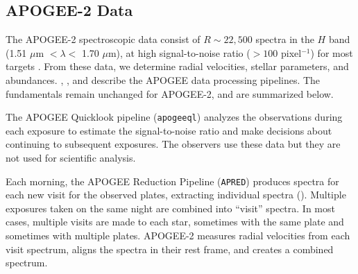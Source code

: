 \subsection{APOGEE-2 Data}

The APOGEE-2 spectroscopic data consist of $R\sim 22,500$ spectra in
the $H$ band (1.51 $\mu$m $< \lambda < $ 1.70 $\mu$m), at high
signal-to-noise ratio ($> 100 $ pixel$^{-1}$) for most targets
\citep{majewski15a}. From these data, we determine radial velocities,
stellar parameters, and abundances. \citet{garciaperez16a},
\citet{holtzman15a}, and \citet{nidever15a} describe the APOGEE data
processing pipelines. The fundamentals remain unchanged for APOGEE-2,
and are summarized below.

The APOGEE Quicklook pipeline ({\tt apogeeql}) analyzes the
observations during each exposure to estimate the signal-to-noise
ratio and make decisions about continuing to subsequent exposures. The
observers use these data but they are not used for scientific
analysis.

Each morning, the APOGEE Reduction Pipeline ({\tt APRED}) produces
spectra for each new visit for the observed plates, extracting
individual spectra (\citealt{horne86a}).  Multiple exposures taken on
the same night are combined into ``visit'' spectra. In most cases,
multiple visits are made to each star, sometimes with the same plate
and sometimes with multiple plates. APOGEE-2 measures radial velocities from
each visit spectrum, aligns the spectra in their rest frame, and
creates a combined spectrum. 

